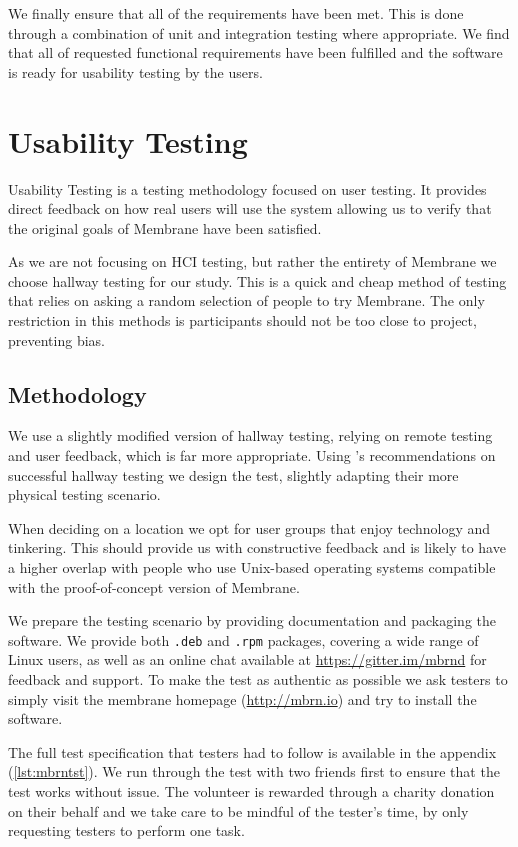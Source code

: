 \documentclass[11pt, a4paper, twocolumn, twoside]{report}
\def\code#1{\texttt{#1}}
\begin{document}
We finally ensure that all of the requirements have been met. This is done through a combination of unit and integration testing where appropriate. We find that all of requested functional requirements have been fulfilled and the software is ready for usability testing by the users.

\section{Usability Testing}

Usability Testing is a testing methodology focused on user testing. It provides direct feedback on how real users will use the system \citep{nielsen1994usability} allowing us to verify that the original goals of Membrane have been satisfied.

As we are not focusing on HCI testing, but rather the entirety of Membrane we choose hallway testing for our study. This is a quick and cheap method of testing that relies on asking a random selection of people to try Membrane. The only restriction in this methods is participants should not be too close to project, preventing bias.

\subsection{Methodology}

We use a slightly modified version of hallway testing, relying on remote testing and user feedback, which is far more appropriate. Using \cite{usajobs2014hallway}'s recommendations on successful hallway testing we design the test, slightly adapting their more physical testing scenario.

When deciding on a location we opt for user groups that enjoy technology and tinkering. This should provide us with constructive feedback and is likely to have a higher overlap with people who use Unix-based operating systems compatible with the proof-of-concept version of Membrane.

We prepare the testing scenario by providing documentation and packaging the software. We provide both \code{.deb} and \code{.rpm} packages, covering a wide range of Linux users, as well as an online chat available at \url{https://gitter.im/mbrnd} for feedback and support. To make the test as authentic as possible we ask testers to simply visit the membrane homepage (\url{http://mbrn.io}) and try to install the software.

The full test specification that testers had to follow is available in the appendix (\ref{lst:mbrntst}). We run through the test with two friends first to ensure that the test works without issue. The volunteer is rewarded through a charity donation on their behalf and we take care to be mindful of the tester's time, by only requesting testers to perform one task.
\end{document}
